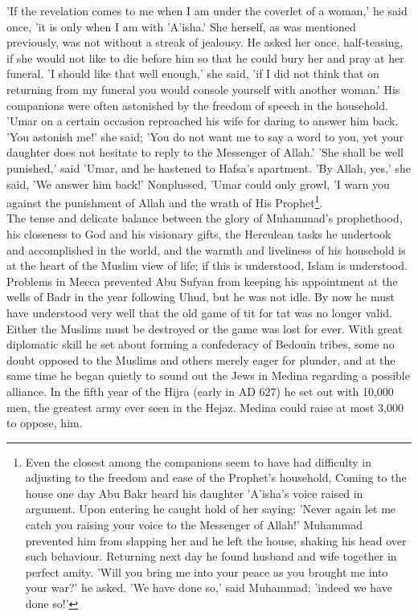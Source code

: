 \documentclass[11pt, b5paper, twoside]{book}
\begin{document}
'If the revelation comes to me when I am under the coverlet of a woman,' he said once, 'it is only 
when I am with 'A'isha.' She herself, as was mentioned previously, was not without a streak of 
jealousy. He asked her once, half-teasing, if she would not like to die before him so that he could 
bury her and pray at her funeral. 'I should like that well enough,' she said, 'if I did not think 
that on returning from my funeral you would console yourself with another woman.' His companions were 
often astonished by the freedom of speech in the household. 'Umar on a certain occasion reproached 
his wife for daring to answer him back. 'You astonish me!' she said; 'You do not want me to say a 
word to you, yet your daughter does not hesitate to reply to the Messenger of Allah.' 'She shall be 
well punished,' said 'Umar, and he hastened to Hafsa's apartment. 'By Allah, yes,' she said, 'We 
answer him back!' Nonplussed, 'Umar could only growl, 'I warn you against the punishment of Allah and 
the wrath of His Prophet\footnote{Even the closest among the companions seem to have had difficulty in adjusting to the freedom and ease of the Prophet's household, Coming to the house one day Abu Bakr heard his daughter 'A'isha's voice raised in argument. Upon entering he caught hold of her saying: 'Never again let me catch you raising your voice to the Messenger of Allah!' Muhammad prevented him from slapping her and he left the house, shaking his head over such behaviour. Returning next day he found husband and wife together in perfect amity. 'Will you bring me into your peace as you brought me into your war?' he asked. 'We have done so,' said Muhammad; 'indeed we have done so!' }.\\

The tense and delicate balance between the glory of Muhammad's prophethood, his closeness to God and 
his visionary gifts, the Herculean tasks he undertook and accomplished in the world, and the warmth 
and liveliness of his household is at the heart of the Muslim view of life; if this is understood, 
Islam is understood. \\

Problems in Mecca prevented Abu Sufyan from keeping his appointment at the wells of Badr in the year 
following Uhud, but he was not idle. By now he must have understood very well that the old game of 
tit for tat was no longer valid. Either the Muslims must be destroyed or the game was lost for ever. 
With great diplomatic skill he set about forming a confederacy of Bedouin tribes, some no doubt 
opposed to the Muslims and others merely eager for plunder, and at the same time he began quietly to 
sound out the Jews in Medina regarding a possible alliance. In the fifth year of the Hijra (early in 
AD 627) he set out with 10,000 men, the greatest army ever seen in the Hejaz. Medina could raise at 
most 3,000 to oppose, him. \\
\end{document}
